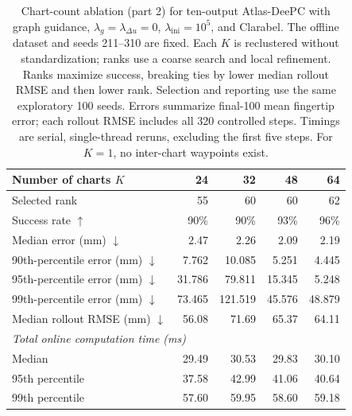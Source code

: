 \documentclass[10pt]{article}
\begin{document}
\begin{table}[htbp]
\centering
\small
\begin{tabular}{lrrrr}
\toprule
Number of charts $K$ & 24 & 32 & 48 & 64 \\
\midrule
Selected rank & 55 & 60 & 60 & 62 \\
Success rate $\uparrow$ & 90\% & 90\% & 93\% & 96\% \\
Median error (mm) $\downarrow$ & 2.47 & 2.26 & 2.09 & 2.19 \\
90th-percentile error (mm) $\downarrow$ & 7.762 & 10.085 & 5.251 & 4.445 \\
95th-percentile error (mm) $\downarrow$ & 31.786 & 79.811 & 15.345 & 5.248 \\
99th-percentile error (mm) $\downarrow$ & 73.465 & 121.519 & 45.576 & 48.879 \\
Median rollout RMSE (mm) $\downarrow$ & 56.08 & 71.69 & 65.37 & 64.11 \\
\midrule
\multicolumn{5}{l}{\textit{Total online computation time (ms)}} \\
Median & 29.49 & 30.53 & 29.83 & 30.10 \\
95th percentile & 37.58 & 42.99 & 41.06 & 40.64 \\
99th percentile & 57.60 & 59.95 & 58.60 & 59.18 \\
\bottomrule
\end{tabular}
\caption{Chart-count ablation (part 2) for ten-output Atlas-DeePC with graph guidance, $\lambda_g=\lambda_{\Delta u}=0$, $\lambda_{\mathrm{ini}}=10^5$, and Clarabel. The offline dataset and seeds 211--310 are fixed. Each $K$ is reclustered without standardization; ranks use a coarse search and local refinement. Ranks maximize success, breaking ties by lower median rollout RMSE and then lower rank. Selection and reporting use the same exploratory 100 seeds. Errors summarize final-100 mean fingertip error; each rollout RMSE includes all 320 controlled steps. Timings are serial, single-thread reruns, excluding the first five steps. For $K=1$, no inter-chart waypoints exist.}
\label{tab:chart-count-rank-2}
\end{table}
\end{document}
